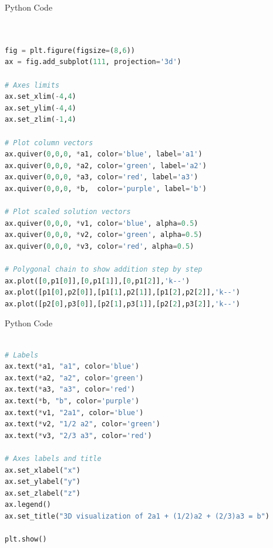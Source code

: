 \documentclass{beamer}
\begin{document}
\begin{frame}[fragile]{Python Code}
\begin{lstlisting}[language=Python]


fig = plt.figure(figsize=(8,6))
ax = fig.add_subplot(111, projection='3d')

# Axes limits
ax.set_xlim(-4,4)
ax.set_ylim(-4,4)
ax.set_zlim(-1,4)

# Plot column vectors
ax.quiver(0,0,0, *a1, color='blue', label='a1')
ax.quiver(0,0,0, *a2, color='green', label='a2')
ax.quiver(0,0,0, *a3, color='red', label='a3')
ax.quiver(0,0,0, *b,  color='purple', label='b')

# Plot scaled solution vectors
ax.quiver(0,0,0, *v1, color='blue', alpha=0.5)
ax.quiver(0,0,0, *v2, color='green', alpha=0.5)
ax.quiver(0,0,0, *v3, color='red', alpha=0.5)

# Polygonal chain to show addition step by step
ax.plot([0,p1[0]],[0,p1[1]],[0,p1[2]],'k--')
ax.plot([p1[0],p2[0]],[p1[1],p2[1]],[p1[2],p2[2]],'k--')
ax.plot([p2[0],p3[0]],[p2[1],p3[1]],[p2[2],p3[2]],'k--')

\end{lstlisting}
\end{frame}

\begin{frame}[fragile]{Python Code}
\begin{lstlisting}[language=Python]

# Labels
ax.text(*a1, "a1", color='blue')
ax.text(*a2, "a2", color='green')
ax.text(*a3, "a3", color='red')
ax.text(*b, "b", color='purple')
ax.text(*v1, "2a1", color='blue')
ax.text(*v2, "1/2 a2", color='green')
ax.text(*v3, "2/3 a3", color='red')

# Axes labels and title
ax.set_xlabel("x")
ax.set_ylabel("y")
ax.set_zlabel("z")
ax.legend()
ax.set_title("3D visualization of 2a1 + (1/2)a2 + (2/3)a3 = b")

plt.show()
\end{lstlisting}
\end{frame}

\end{document}
